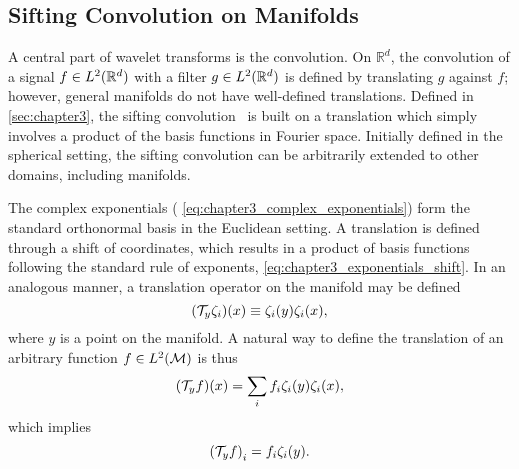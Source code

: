 \subsection{Sifting Convolution on Manifolds}\label{sec:chapter5_sifting_convolution_manifolds}

A central part of wavelet transforms is the convolution.
On \(\mathbb{R}^{d}\), the convolution of a signal \(f \in L^{2}(\mathbb{R}^{d})\) with a filter \(g \in L^{2}(\mathbb{R}^{d})\) is defined by translating \(g\) against \(f\); however, general manifolds do not have well-defined translations.
Defined in \cref{sec:chapter3}, the sifting convolution~\cite{Roddy2021} is built on a translation which simply involves a product of the basis functions in Fourier space.
Initially defined in the spherical setting, the sifting convolution can be arbitrarily extended to other domains, including manifolds.

The complex exponentials (\eg{} \cref{eq:chapter3_complex_exponentials}) form the standard orthonormal basis in the Euclidean setting.
A translation is defined through a shift of coordinates, which results in a product of basis functions following the standard rule of exponents, \ie{} \cref{eq:chapter3_exponentials_shift}.
In an analogous manner, a translation operator on the manifold may be defined
%
\begin{equation}
	(\mathcal{T}_{y}\zeta_{i})(x)
	\equiv \zeta_{i}(y) \zeta_{i}(x),
\end{equation}
%
where \(y\) is a point on the manifold.
A natural way to define the translation of an arbitrary function \(f \in L^{2}(\mathcal{M})\) is thus
%
\begin{equation}\label{eq:chapter5_translation_mesh}
	(\mathcal{T}_{y}f)(x)
	= \displaystyle\sum\limits_{i} f_{i} \zeta_{i}(y) \zeta_{i}(x),
\end{equation}
%
which implies
%
\begin{equation}
	{(\mathcal{T}_{y}f)}_{i}
	= f_{i} \zeta_{i}(y).
\end{equation}

